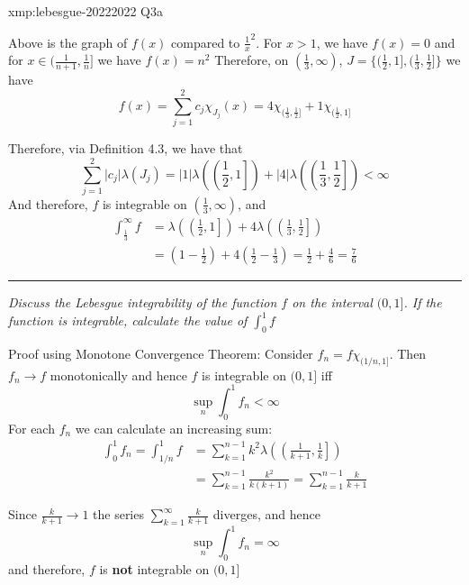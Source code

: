 \documentclass[landscape, 8pt]{extarticle}
\begin{document}
\begin{multicols}{3}
\begin{xmp}{xmp:lebesgue-2022}{2022 Q3a}
\begin{center}
	\end{center}
	\vspace{-5pt}

	Above is the graph of $f(x)$ compared to $\frac{1}{x}^{2}$.
	\newline For $x > 1$, we have $f(x) = 0$ and for $x\in (\frac{1}{n+1}, \frac{1}{n}]$ we have $f(x) = n^{2}$
	\newline Therefore, on $(\frac{1}{3}, \infty)$, $J = \{( \frac{1}{2}, 1], ( \frac{1}{3}, \frac{1}{2}]\}$ we have
		\[f(x) = \sum_{j = 1}^{2} c_{j} \chi_{J_{j}}(x) = 4\chi_{( \frac{1}{3}, \frac{1}{2}]} + 1\chi_{( \frac{1}{2}, 1]}\]

	Therefore, via Definition 4.3, we have that
	\[\sum_{j = 1}^{2} \lvert c_{j} \rvert \lambda(J_{j}) =\lvert 1 \rvert \lambda\left( \left( \frac{1}{2}, 1\right]\right) + \lvert 4 \rvert \lambda\left( \left( \frac{1}{3}, \frac{1}{2}\right]\right) < \infty\]
	And therefore, $f$ is integrable on $(\frac{1}{3}, \infty)$, and
	\begin{align*}
		\int_{ \frac{1}{3}}^{\infty} f &= \lambda\left( \left( \frac{1}{2}, 1\right]\right) + 4\lambda\left( \left( \frac{1}{3}, \frac{1}{2}\right]\right) \\
									   &= \left(1 - \frac{1}{2}\right) + 4\left( \frac{1}{2} - \frac{1}{3}\right) = \frac{1}{2} + \frac{4}{6} = \frac{7}{6}
	\end{align*}

	\noindent\rule{\textwidth}{0.2pt}
	\textit{Discuss the Lebesgue integrability of the function $f$ on the interval $(0, 1]$. If the function is integrable, calculate the value of $\int_{0}^{1} f$}

	Proof using Monotone Convergence Theorem: Consider $f_{n} = f \chi_{(1 /n, 1]}$. Then $f_{n}\to f$ monotonically and hence $f$ is integrable on $(0, 1]$ iff
	\[\sup_{n} \int_{0}^{1} f_{n} < \infty\]
	For each $f_{n}$ we can calculate an increasing sum:
	\begin{align*}
		\int_{0}^{1} f_{n} = \int_{1 /n}^{1} f &= \sum_{k = 1}^{n - 1} k^{2} \lambda \left(\left(\frac{1}{k+1}, \frac{1}{k}\right]\right) \\
											   &= \sum_{k = 1}^{n - 1} \frac{k^{2}}{k(k+1)} =\sum_{k = 1}^{n - 1} \frac{k}{k+1} 
	\end{align*}

	Since $\frac{k}{k + 1} \to 1$ the series $\sum_{k = 1}^{\infty} \frac{k}{k+1}$ diverges, and hence
	\[\sup_{n} \int_{0}^{1} f_{n} = \infty\]
	and therefore, $f$ is \textbf{not} integrable on $(0, 1]$
\end{xmp}



\end{multicols}
\end{document}

